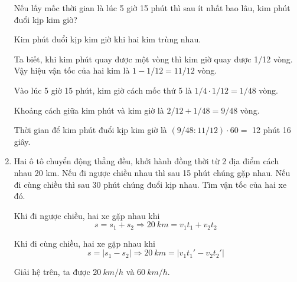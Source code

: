 \begin{enumerate}[label=\bfseries Câu \arabic*:]
\cauhoi
{Nếu lấy mốc thời gian là lúc 5 giờ 15 phút thì sau ít nhất bao lâu, kim phút đuổi kịp kim giờ?
}

\loigiai
{
Kim phút đuổi kịp kim giờ khi hai kim trùng nhau.

Ta biết, khi kim phút quay được một vòng thì kim giờ quay được 1/12 vòng. Vậy hiệu vận tốc của hai kim là $1-1/12=11/12$ vòng.

Vào lúc 5 giờ 15 phút, kim giờ cách mốc thứ 5 là $1/4 \cdot 1/12 = 1/48$ vòng.

Khoảng cách giữa kim phút và kim giờ là $2/12+1/48=9/48$ vòng.

Thời gian để kim phút đuổi kịp kim giờ là $(9/48 :11/12) \cdot 60=$ 12 phút 16 giây.
}
\item {}

\cauhoi
{Hai ô tô chuyển động thẳng đều, khởi hành đồng thời từ 2 địa điểm cách nhau 20 km. Nếu đi ngược chiều nhau thì sau 15 phút chúng gặp nhau. Nếu đi cùng chiều thì sau 30 phút chúng đuổi kịp nhau. Tìm vận tốc của hai xe đó.
}

\loigiai
{	Khi đi ngược chiều, hai xe gặp nhau khi
	$$s = s_1 + s_2 \Rightarrow \SI{20}{km} = v_1 t_1 + v_2 t_2$$
	
	Khi đi cùng chiều, hai xe gặp nhau khi
	$$s=|s_1 - s_2| \Rightarrow \SI{20}{km} = |v_1 t_1' - v_2t_2'|$$
	
	Giải hệ trên, ta được $\SI{20}{km/h}$ và $\SI{60}{km/h}$.
}
\end{enumerate}